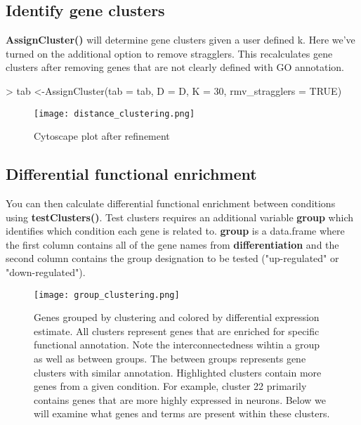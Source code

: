\documentclass{article}
\begin{document}
\subsection*{Identify gene clusters}
\textbf{AssignCluster()} will determine gene clusters given a user defined k. Here we've turned on the additional option to remove stragglers. This recalculates gene clusters after removing genes that are not clearly defined with GO annotation.
\vspace{5mm}
\begin{Schunk}
\begin{Sinput}
> tab <-AssignCluster(tab = tab, D = D, K = 30, rmv_stragglers = TRUE)
\end{Sinput}
\end{Schunk}
\begin{figure}[ht]
\texttt{[image: distance\_clustering.png]}
\centering
\caption{Cytoscape plot after refinement}
\end{figure}

\subsection*{Differential functional enrichment}
You can then calculate differential functional enrichment between conditions using \textbf{testClusters()}. Test clusters requires an additional variable \textbf{group} which identifies which condition each gene is related to. \textbf{group} is a data.frame where the first column contains all of the gene names from \textbf{differentiation} and the second column contains the group designation to be tested ("up-regulated" or "down-regulated").

\begin{figure}[ht]
\texttt{[image: group\_clustering.png]}
\centering
\caption{Genes grouped by clustering and colored by differential expression estimate. All clusters represent genes that are enriched for specific functional annotation. Note the interconnectedness wihtin a group as well as between groups. The between groups represents gene clusters with similar annotation. Highlighted clusters contain more genes from a given condition. For example, cluster 22 primarily contains genes that are more highly expressed in neurons. Below we will examine what genes and terms are present within these clusters. }
\end{figure}
\end{document}
